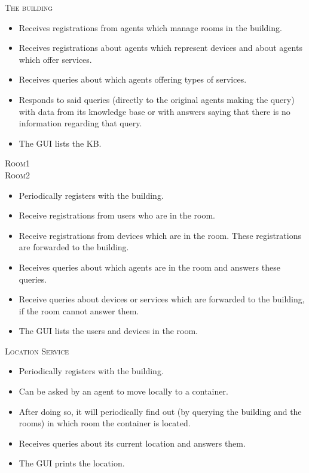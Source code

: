 \documentclass[a4paper, 12pt, twoside]{article}
\begin{document}


\textsc{The building}
\begin{itemize}
	\item Receives registrations from agents which manage rooms in the building.
	\item Receives registrations about agents which represent devices and about agents which offer services.
	\item Receives queries about which agents offering types of services.
	\item Responds to said queries (directly to the original agents making the query) with data from its knowledge base or with answers saying that there is no information regarding that query.
	\item The GUI lists the KB.
\end{itemize}


\textsc{Room1} \\
\textsc{Room2}
\begin{itemize}
	\item Periodically registers with the building.
	\item Receive registrations from users who are in the room.
	\item Receive registrations from devices which are in the room. These registrations are forwarded to the building.
	\item Receives queries about which agents are in the room and answers these queries.
	\item Receive queries about devices or services which are forwarded to the building, if the room cannot answer them.
	\item The GUI lists the users and devices in the room.
\end{itemize}



\textsc{Location Service}
\begin{itemize}
	\item Periodically registers with the building.
	\item Can be asked by an agent to move locally to a container.
	\item After doing so, it will periodically find out (by querying the building and the rooms) in which room the container is located.
	\item Receives queries about its current location and answers them.
	\item The GUI prints the location.
\end{itemize}
\end{document}

